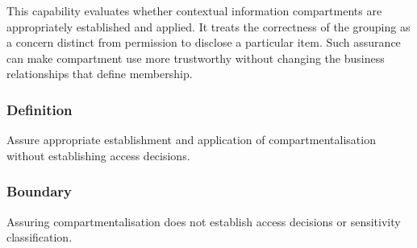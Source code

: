 This capability evaluates whether contextual information compartments are appropriately established and applied. It treats the correctness of the grouping as a concern distinct from permission to disclose a particular item. Such assurance can make compartment use more trustworthy without changing the business relationships that define membership.

\subsubsection*{Definition}

Assure appropriate establishment and application of compartmentalisation without establishing access decisions.

\subsubsection*{Boundary}

Assuring compartmentalisation does not establish access decisions or sensitivity classification.

